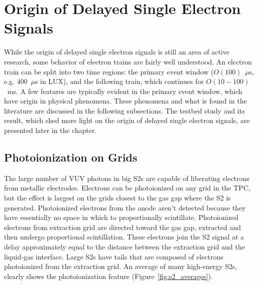 \section{Origin of Delayed Single Electron Signals}
While the origin of delayed single electron signals is still an area of active research, some behavior of electron trains are fairly well understood. An electron train can be split into two time regions: the primary event window ($O(100)$~$\mu$s, e.g. 400~$\mu$s in \ac{LUX}), and the following train, which continues for $O(10-100)$~ms. A few features are typically evident in the primary event window, which have origin in physical phenomena. These phenomena and what is found in the literature are discussed in the following subsections. The testbed study and its result, which shed more light on the origin of delayed single electron signals, are presented later in the chapter. 

\subsection{Photoionization on Grids} 
The large number of \ac{VUV} photons in big S2s are capable of liberating electrons from metallic electrodes. Electrons can be photoionized on any grid in the \ac{TPC}, but the effect is largest on the grids closest to the gas gap where the S2 is generated. Photoionized electrons from the anode aren't detected because they have essentially no space in which to proportionally scintillate. Photoionized electrons from extraction grid are directed toward the gas gap, extracted and then undergo proportional scintillation. These electrons join the S2 signal at a delay approximately equal to the distance between the extraction grid and the liquid-gas interface. Large S2s have tails that are composed of electrons photoionized from the extraction grid. An average of many high-energy S2s, clearly shows the photoionization feature (Figure~\ref{fig:s2_averages}). 

